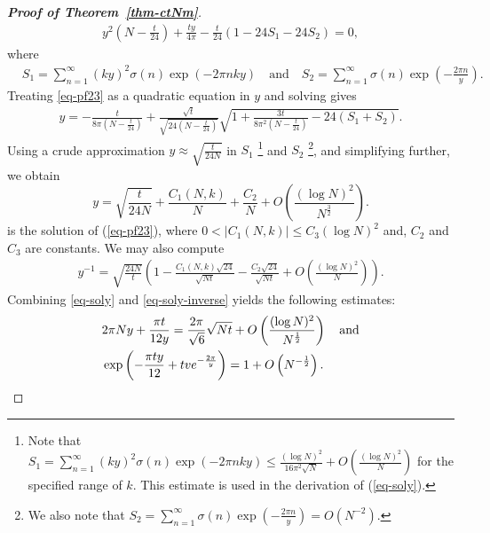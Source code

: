 \documentclass[11pt]{amsart}
\theoremstyle{plain}
\numberwithin{equation}{section}
\begin{document}
\begin{proof}[\textbf{\boldmath Proof of Theorem~\ref{thm-ctNm}}]
		\begin{align}\label{eq-pf23}
			y^{2}\left(N-\frac{t}{24}\right)+
			\frac{ty}{4\pi}-\frac{t}{24}\left(1-24S_1-24S_2\right)=0,
		\end{align}
		where
		\begin{align*}
			& S_1=\sum_{n=1}^{\infty}(ky)^{2}\sigma(n)\exp(-2\pi nky)\quad\text{and}\quad  S_2=\sum_{n=1}^{\infty}\sigma(n)\exp\left(-\frac{2\pi n}{y}\right).
		\end{align*}  
		Treating \eqref{eq-pf23} as a quadratic equation in $y$ and solving gives
		\begin{align*}
			y=-\frac{t}{8\pi\left(N-\frac{t}{24}\right)} +\frac{\sqrt{t}}{\sqrt{24\left(N-\frac{t}{24}\right)}}\sqrt{1+\frac{3t}{8\pi^{2}\left(N-\frac{t}{24}\right)}-24(S_1+S_2)}.   
		\end{align*} 
		Using a crude approximation $y\approx\sqrt{\frac{t}{24N}}$ in $S_{1}$ \footnote{Note that  $S_1=\sum_{n=1}^{\infty}(ky)^{2}\sigma(n)\exp(-2\pi nky)\le \frac{(\log N)^{2}}{16\pi^{2}\sqrt{N}}+O\left(\frac{(\log N)^{2}}{N}\right)$ for the specified range of $k$. This estimate is used in the derivation of (\ref{eq-soly}).} and $S_{2}$ \footnote{We also note that $S_2=\sum_{n=1}^{\infty}\sigma(n)\exp\left(-\frac{2\pi n}{y}\right)=O(N^{-2}).$}, and simplifying further, we obtain 
		\begin{equation}\label{eq-soly}
			y=\sqrt{\frac{t}{24N}}+\frac{C_{1}(N,k)}{N}+ \frac{C_{2}}{N}+O\left(\frac{(\log N)^{2}}{N^{\frac{3}{2}}}\right) . 
		\end{equation}
		is the solution of (\ref{eq-pf23}),  where $0<|C_1(N,k)|\le C_3(\log N)^{2}$ and, $C_2$ and $C_3$ are constants. We may also compute
		\begin{align}\label{eq-soly-inverse}
			y^{-1}=\sqrt{\frac{24N}{t}}\left(1-\frac{C_1(N,k)\sqrt{24}}{\sqrt{Nt}}-\frac{C_2\sqrt{24}}{\sqrt{Nt}}+O\left(\frac{(\log N)^{2}}{N}\right)\right).   
		\end{align}
		Combining \eqref{eq-soly} and \eqref{eq-soly-inverse} yields the following estimates:
		\begin{align}\label{eq-yy-inverse}
			\notag
			&2\pi Ny+\frac{\pi t}{12y}=\frac{2\pi}{\sqrt{6}}\sqrt{Nt}+O\left(\frac{(\log N)^{2}}{N^{\frac{1}{2}}}\right)\quad\text{and}\\
			&\exp\left(-\frac{\pi ty}{12}+tve^{-\frac{2\pi}{y}}\right)=1+O\left(N^{-\frac{1}{2}}\right).   
		\end{align}

\end{proof}
\end{document}
